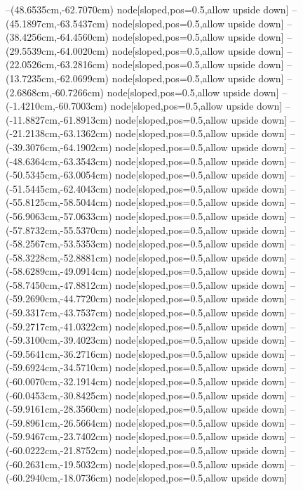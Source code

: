 --(48.6535cm,-62.7070cm) node[sloped,pos=0.5,allow upside down]{\ArrowIn}
--(45.1897cm,-63.5437cm) node[sloped,pos=0.5,allow upside down]{\ArrowIn}
--(38.4256cm,-64.4560cm) node[sloped,pos=0.5,allow upside down]{\ArrowIn}
--(29.5539cm,-64.0020cm) node[sloped,pos=0.5,allow upside down]{\ArrowIn}
--(22.0526cm,-63.2816cm) node[sloped,pos=0.5,allow upside down]{\ArrowIn}
--(13.7235cm,-62.0699cm) node[sloped,pos=0.5,allow upside down]{\ArrowIn}
--(2.6868cm,-60.7266cm) node[sloped,pos=0.5,allow upside down]{\ArrowIn}
--(-1.4210cm,-60.7003cm) node[sloped,pos=0.5,allow upside down]{\ArrowIn}
--(-11.8827cm,-61.8913cm) node[sloped,pos=0.5,allow upside down]{\ArrowIn}
--(-21.2138cm,-63.1362cm) node[sloped,pos=0.5,allow upside down]{\ArrowIn}
--(-39.3076cm,-64.1902cm) node[sloped,pos=0.5,allow upside down]{\ArrowIn}
--(-48.6364cm,-63.3543cm) node[sloped,pos=0.5,allow upside down]{\ArrowIn}
--(-50.5345cm,-63.0054cm) node[sloped,pos=0.5,allow upside down]{\ArrowIn}
--(-51.5445cm,-62.4043cm) node[sloped,pos=0.5,allow upside down]{\ArrowIn}
--(-55.8125cm,-58.5044cm) node[sloped,pos=0.5,allow upside down]{\ArrowIn}
--(-56.9063cm,-57.0633cm) node[sloped,pos=0.5,allow upside down]{\ArrowIn}
--(-57.8732cm,-55.5370cm) node[sloped,pos=0.5,allow upside down]{\ArrowIn}
--(-58.2567cm,-53.5353cm) node[sloped,pos=0.5,allow upside down]{\ArrowIn}
--(-58.3228cm,-52.8881cm) node[sloped,pos=0.5,allow upside down]{\arrowIn}
--(-58.6289cm,-49.0914cm) node[sloped,pos=0.5,allow upside down]{\ArrowIn}
--(-58.7450cm,-47.8812cm) node[sloped,pos=0.5,allow upside down]{\ArrowIn}
--(-59.2690cm,-44.7720cm) node[sloped,pos=0.5,allow upside down]{\ArrowIn}
--(-59.3317cm,-43.7537cm) node[sloped,pos=0.5,allow upside down]{\ArrowIn}
--(-59.2717cm,-41.0322cm) node[sloped,pos=0.5,allow upside down]{\ArrowIn}
--(-59.3100cm,-39.4023cm) node[sloped,pos=0.5,allow upside down]{\ArrowIn}
--(-59.5641cm,-36.2716cm) node[sloped,pos=0.5,allow upside down]{\ArrowIn}
--(-59.6924cm,-34.5710cm) node[sloped,pos=0.5,allow upside down]{\ArrowIn}
--(-60.0070cm,-32.1914cm) node[sloped,pos=0.5,allow upside down]{\ArrowIn}
--(-60.0453cm,-30.8425cm) node[sloped,pos=0.5,allow upside down]{\ArrowIn}
--(-59.9161cm,-28.3560cm) node[sloped,pos=0.5,allow upside down]{\ArrowIn}
--(-59.8961cm,-26.5664cm) node[sloped,pos=0.5,allow upside down]{\ArrowIn}
--(-59.9467cm,-23.7402cm) node[sloped,pos=0.5,allow upside down]{\ArrowIn}
--(-60.0222cm,-21.8752cm) node[sloped,pos=0.5,allow upside down]{\ArrowIn}
--(-60.2631cm,-19.5032cm) node[sloped,pos=0.5,allow upside down]{\ArrowIn}
--(-60.2940cm,-18.0736cm) node[sloped,pos=0.5,allow upside down]{\ArrowIn}
